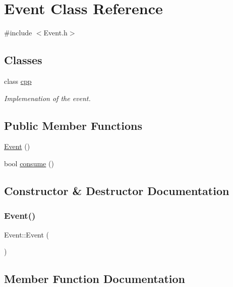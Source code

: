 \hypertarget{class_event}{}\section{Event Class Reference}
\label{class_event}


{\ttfamily \#include $<$Event.\+h$>$}

\subsection*{Classes}
\begin{DoxyCompactItemize}
\item 
class \hyperlink{class_event_1_1cpp}{cpp}
\begin{DoxyCompactList}\small\item\em Implemenation of the event. \end{DoxyCompactList}\end{DoxyCompactItemize}
\subsection*{Public Member Functions}
\begin{DoxyCompactItemize}
\item 
\hyperlink{class_event_a5a40dd4708297f7031e29b39e039ae10}{Event} ()
\item 
bool \hyperlink{class_event_a93521bedffd2a0b9c979e15241e060ba}{consume} ()
\end{DoxyCompactItemize}


\subsection{Constructor \& Destructor Documentation}
\mbox{\label{class_event_a5a40dd4708297f7031e29b39e039ae10}} 
\subsubsection{\texorpdfstring{Event()}{Event()}}
{\footnotesize\ttfamily Event\+::\+Event (\begin{DoxyParamCaption}{ }\end{DoxyParamCaption})}



\subsection{Member Function Documentation}
\mbox{\label{class_event_a93521bedffd2a0b9c979e15241e060ba}} 
